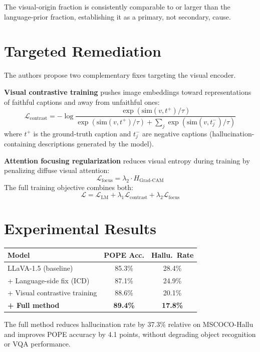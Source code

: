 \documentclass[10pt,twocolumn]{article}
\begin{document}
The visual-origin fraction is consistently comparable to or larger than
the language-prior fraction, establishing it as a primary, not secondary,
cause.

\section{Targeted Remediation}

The authors propose two complementary fixes targeting the visual encoder.

\textbf{Visual contrastive training} pushes image embeddings toward
representations of faithful captions and away from unfaithful ones:
\[
  \mathcal{L}_{\text{contrast}} = -\log
  \frac{\exp(\text{sim}(v, t^+)/\tau)}
       {\exp(\text{sim}(v, t^+)/\tau) + \sum_j \exp(\text{sim}(v, t^-_j)/\tau)}
\]
where $t^+$ is the ground-truth caption and $t^-_j$ are negative captions
(hallucination-containing descriptions generated by the model).

\textbf{Attention focusing regularization} reduces visual entropy during
training by penalizing diffuse visual attention:
\[
  \mathcal{L}_{\text{focus}} = \lambda_2 \cdot H_{\text{Grad-CAM}}
\]
The full training objective combines both:
\[
  \mathcal{L} = \mathcal{L}_{\text{LM}}
              + \lambda_1 \mathcal{L}_{\text{contrast}}
              + \lambda_2 \mathcal{L}_{\text{focus}}
\]

\section{Experimental Results}

\begin{center}
\begin{tabular}{lcc}
\toprule
Model & POPE Acc. & Hallu.\ Rate \\
\midrule
LLaVA-1.5 (baseline)         & 85.3\% & 28.4\% \\
+ Language-side fix (ICD)     & 87.1\% & 24.9\% \\
+ Visual contrastive training & 88.6\% & 20.1\% \\
\textbf{+ Full method}        & \textbf{89.4\%} & \textbf{17.8\%} \\
\bottomrule
\end{tabular}
\end{center}

The full method reduces hallucination rate by 37.3\% relative on
MSCOCO-Hallu and improves POPE accuracy by 4.1 points, without
degrading object recognition or VQA performance.
\end{document}
